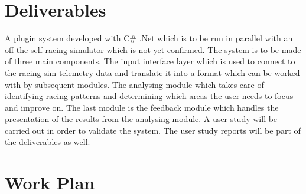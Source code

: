 \documentclass{article}
\begin{document}
\section{Deliverables}

A plugin system developed with C\# .Net which is to be run in parallel with an off the self-racing simulator which is not yet confirmed. The system is to be made of three main components. The input interface layer which is used to connect to the racing sim telemetry data and translate it into a format which can be worked with by subsequent modules. The analysing module which takes care of identifying racing patterns and determining which areas the user needs to focus and improve on. The last module is the feedback module which handles the presentation of the results from the analysing module.
A user study will be carried out in order to validate the system. The user study reports will be part of the deliverables as well.

\section{Work Plan}


\newpage
{}

\end{document}
